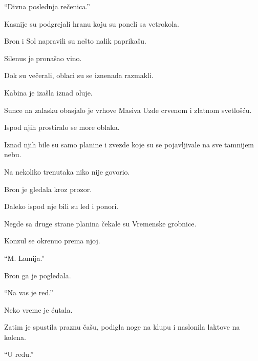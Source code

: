 ``Divna poslednja rečenica.''

\bigskip

Kasnije su podgrejali hranu koju su poneli sa vetrokola.

Bron i Sol napravili su nešto nalik paprikašu.

Silenus je pronašao vino.

Dok su večerali, oblaci su se iznenada razmakli.

Kabina je izašla iznad oluje.

Sunce na zalasku obasjalo je vrhove Masiva Uzde crvenom i zlatnom svetlošću.

Ispod njih prostiralo se more oblaka.

Iznad njih bile su samo planine i zvezde koje su se pojavljivale na sve tamnijem nebu.

Na nekoliko trenutaka niko nije govorio.

Bron je gledala kroz prozor.

Daleko ispod nje bili su led i ponori.

Negde sa druge strane planina čekale su Vremenske grobnice.

Konzul se okrenuo prema njoj.

``M. Lamija.''

Bron ga je pogledala.

``Na vas je red.''

Neko vreme je ćutala.

Zatim je spustila praznu čašu, podigla noge na klupu i naslonila laktove na kolena.

``U redu.''
